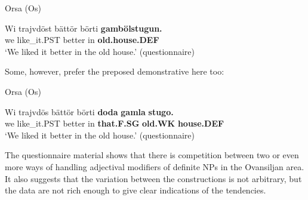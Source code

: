 
\item 

Orsa (Os)



 \ea\label{}
\gll Wi  trajvdöst  bättör  börti  \textbf{gambölstugun.}\\


we  like\_it.PST  better  in  \textbf{old.house.DEF}\\

\glt ‘We liked it better in the old house.’ (questionnaire)

\z

Some, however, prefer the preposed demonstrative here too:


\item 

Orsa (Os)



 \ea\label{}
\gll Wi  trajvdös  bättör  börti  \textbf{doda} \textbf{gamla} \textbf{stugo.}\\


we  like\_it.PST  better  in  \textbf{that.F.SG} \textbf{old.WK} \textbf{house.DEF}\\

\glt ‘We liked it better in the old house.’ (questionnaire)

\z

The questionnaire material shows that there is competition between two or even more ways of handling adjectival modifiers of definite NPs in the Ovansiljan area. It also suggests that the variation between the constructions is not arbitrary, but the data are not rich enough to give clear indications of the tendencies. 

